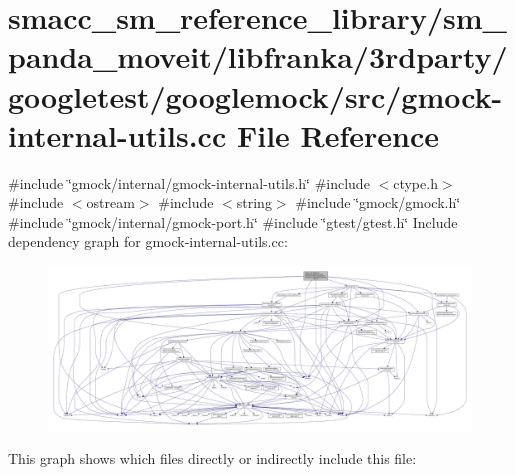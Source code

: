 \hypertarget{gmock-internal-utils_8cc}{}\section{smacc\+\_\+sm\+\_\+reference\+\_\+library/sm\+\_\+panda\+\_\+moveit/libfranka/3rdparty/googletest/googlemock/src/gmock-\/internal-\/utils.cc File Reference}
\label{gmock-internal-utils_8cc}
{\ttfamily \#include \char`\"{}gmock/internal/gmock-\/internal-\/utils.\+h\char`\"{}}\newline
{\ttfamily \#include $<$ctype.\+h$>$}\newline
{\ttfamily \#include $<$ostream$>$}\newline
{\ttfamily \#include $<$string$>$}\newline
{\ttfamily \#include \char`\"{}gmock/gmock.\+h\char`\"{}}\newline
{\ttfamily \#include \char`\"{}gmock/internal/gmock-\/port.\+h\char`\"{}}\newline
{\ttfamily \#include \char`\"{}gtest/gtest.\+h\char`\"{}}\newline
Include dependency graph for gmock-\/internal-\/utils.cc\+:
\nopagebreak
\begin{figure}[H]
\begin{center}
\leavevmode
\includegraphics[width=350pt]{gmock-internal-utils_8cc__incl}
\end{center}
\end{figure}
This graph shows which files directly or indirectly include this file\+:
\nopagebreak
